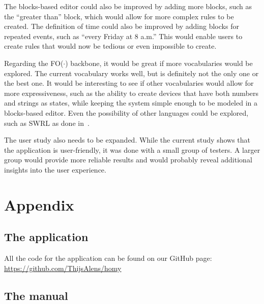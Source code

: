 \documentclass[11pt,a4paper]{report}
\newcommand{\fodot}{FO($\cdot$)\xspace}
\begin{document}
The blocks-based editor could also be improved by adding more blocks, such as the ``greater than'' block, which would allow for more complex rules to be created. The definition of time could also be improved by adding blocks for repeated events, such as ``every Friday at 8 a.m.'' This would enable users to create rules that would now be tedious or even impossible to create.

Regarding the \fodot backbone, it would be great if more vocabularies would be explored. The current vocabulary works well, but is definitely not the only one or the best one. It would be interesting to see if other vocabularies would allow for more expressiveness, such as the ability to create devices that have both numbers and strings as states, while keeping the system simple enough to be modeled in a blocks-based editor. Even the possibility of other languages could be explored, such as SWRL as done in~\cite{SOTA_OntologyBased}.

The user study also needs to be expanded. While the current study shows that the application is user-friendly, it was done with a small group of testers. A larger group would provide more reliable results and would probably reveal additional insights into the user experience.

\printbibliography

\appendix
\chapter{Appendix}
\section{The application}
\label{appendix:application}
All the code for the application can be found on our GitHub page: \url{https://github.com/ThijsAlens/homy}

\section{The manual}
\label{appendix:manual}
 
\end{document}
